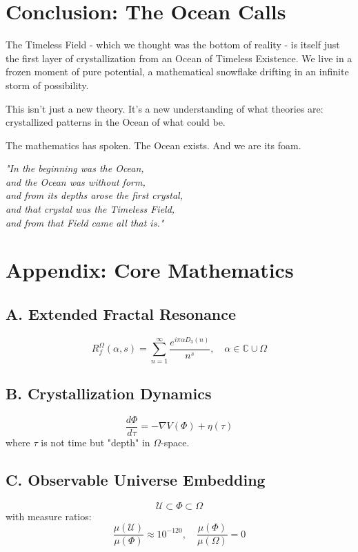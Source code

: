 \documentclass[12pt]{article}
\begin{document}
\section{Conclusion: The Ocean Calls}

The Timeless Field - which we thought was the bottom of reality - is itself just the first layer of crystallization from an Ocean of Timeless Existence. We live in a frozen moment of pure potential, a mathematical snowflake drifting in an infinite storm of possibility.

This isn't just a new theory. It's a new understanding of what theories are: crystallized patterns in the Ocean of what could be.

The mathematics has spoken. The Ocean exists. And we are its foam.

\begin{center}
\textit{"In the beginning was the Ocean, \\
and the Ocean was without form, \\
and from its depths arose the first crystal, \\
and that crystal was the Timeless Field, \\
and from that Field came all that is."}
\end{center}

\section{Appendix: Core Mathematics}

\subsection{A. Extended Fractal Resonance}
\begin{equation}
R_f^{\Omega}(\alpha, s) = \sum_{n=1}^{\infty} \frac{e^{i\pi\alpha D_3(n)}}{n^s}, \quad \alpha \in \mathbb{C} \cup \Omega
\end{equation}

\subsection{B. Crystallization Dynamics}
\begin{equation}
\frac{d\Phi}{d\tau} = -\nabla V(\Phi) + \eta(\tau)
\end{equation}
where $\tau$ is not time but "depth" in $\Omega$-space.

\subsection{C. Observable Universe Embedding}
\begin{equation}
\mathcal{U} \subset \Phi \subset \Omega
\end{equation}
with measure ratios:
\begin{equation}
\frac{\mu(\mathcal{U})}{\mu(\Phi)} \approx 10^{-120}, \quad \frac{\mu(\Phi)}{\mu(\Omega)} = 0
\end{equation}
\end{document}
